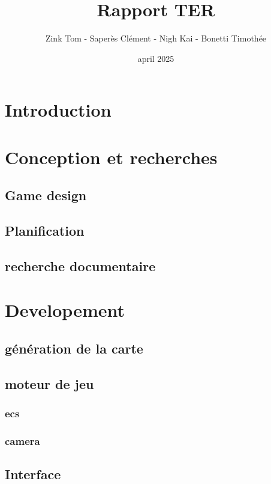 \documentclass[french,a4paper,10pt]{article}
\title{\color{astral} \sffamily \bfseries Rapport TER}
\author{Zink Tom - Saperès Clément - Nigh Kai - Bonetti Timothée}
\date{april 2025}
\begin{document}
\maketitle

\hypersetup{
    hidelinks           %
}

\tableofcontents


\newpage

\section{Introduction}

\section{Conception et recherches}
    \subsection{Game design}
    \subsection{Planification}
    \subsection{recherche documentaire}

\section{Developement}
    \subsection{génération de la carte}
    
    \subsection{moteur de jeu}
        \subsubsection{ecs}
        \subsubsection{camera}

    \subsection{Interface}
    
\end{document}
